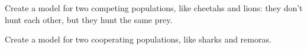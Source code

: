 \begin{exercises}

	\begin{problist}
	\prob Create a model for two competing populations, like cheetahs and lions: they don't hunt each other, but they hunt the same prey.
	
	\prob Create a model for two cooperating populations, like sharks and remoras. 

	\end{problist}
\end{exercises}
